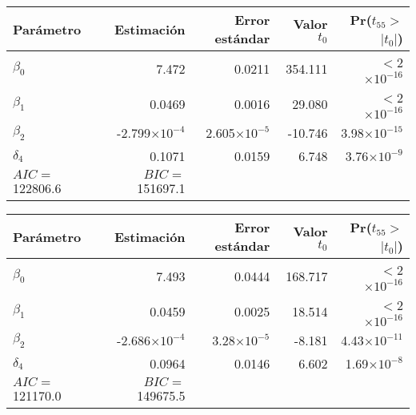 \documentclass[11pt]{article}
\begin{document}
\begin{table}[ht]
\centering
\begin{tabular}{lrrrr}
\hline
 Parámetro & Estimación & Error estándar & Valor $t_0$ & Pr($t_{55}>$$|t_0|$) \\ 
  \hline
$\beta_0$ & 7.472 & 0.0211 & 354.111 & $<$2$\times10^{-16}$ \\ 
  $\beta_1$ & 0.0469 & 0.0016 & 29.080 & $<$2$\times10^{-16}$ \\ 
  $\beta_2$ & -2.799$\times10^{-4}$ & 2.605$\times10^{-5}$ & -10.746 & 3.98$\times10^{-15}$ \\ 
  $\delta_4$ & 0.1071 & 0.0159 & 6.748 & 3.76$\times10^{-9}$ \\ 
   \hline
	$AIC=$ 122806.6 & $BIC=$ 151697.1 & & & \\
	\hline
\end{tabular}
\end{table}

\begin{table}[ht]
\centering
\begin{tabular}{lrrrr}
\hline
 Parámetro& Estimación & Error estándar & Valor $t_0$ & Pr($t_{55}>$$|t_0|$) \\ 
  \hline
$\beta_0$ & 7.493 & 0.0444 & 168.717 & $<$2$\times10^{-16}$ \\ 
  $\beta_1$ & 0.0459 & 0.0025 & 18.514 & $<$2$\times10^{-16}$ \\ 
  $\beta_2$ & -2.686$\times10^{-4}$ & 3.28$\times10^{-5}$ & -8.181 & 4.43$\times10^{-11}$ \\ 
  $\delta_4$ & 0.0964 & 0.0146 & 6.602 & 1.69$\times10^{-8}$ \\ 
   \hline
	$AIC=$ 121170.0 & $BIC=$ 149675.5 & & & \\
	\hline
\end{tabular}
\end{table}
\end{document}
